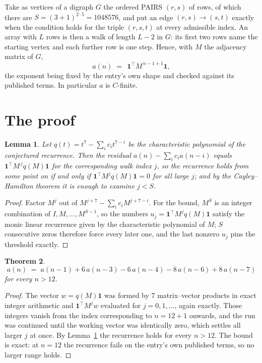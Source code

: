 \documentclass[11pt,a4paper]{article}
\theoremstyle{plain}
\newtheorem{theorem}{Theorem}
\newtheorem{lemma}[theorem]{Lemma}
\theoremstyle{definition}
\begin{document}
Take as vertices of a digraph $G$ the ordered PAIRS $(r,s)$ of rows, of which there are
$S=(3+1)^{2\cdot5}=1048576$, and put an edge $(r,s)\to(s,t)$ exactly when the condition
holds for the triple $(r,s,t)$ at every admissible index. An array with $L$ rows is then a
walk of length $L-2$ in $G$: its first two rows name the starting vertex and each further
row is one step. Hence, with $M$ the adjacency matrix of $G$,
\[
a(n)\;=\;\,\mathbf{1}^{\!\top}M^{\,n-1+1}\mathbf{1},
\]
the exponent being fixed by the entry's own shape and checked against its published terms.
In particular $a$ is $C$-finite.

\section{The proof}

\begin{lemma}\label{lem:crit}
Let $q(t)=t^{7}-\sum_i c_it^{7-i}$ be the characteristic polynomial of the
conjectured recurrence. Then the residual $a(n)-\sum_ic_ia(n-i)$ equals
$\mathbf{1}^{\!\top}M^{\,j}q(M)\mathbf{1}$ for the corresponding walk index
$j$, so the recurrence holds from some point on if and only if
$\mathbf{1}^{\!\top}M^{j}q(M)\mathbf{1}=0$ for all large $j$; and by the
Cayley--Hamilton theorem it is enough to examine $j<S$.
\end{lemma}

\begin{proof}
Factor $M^{j}$ out of $M^{j+7}-\sum_ic_iM^{j+7-i}$. For the bound, $M^{S}$
is an integer combination of $I,M,\dots,M^{S-1}$, so the numbers
$u_j=\mathbf{1}^{\!\top}M^{j}q(M)\mathbf{1}$ satisfy the monic linear recurrence given by
the characteristic polynomial of $M$; $S$ consecutive zeros therefore force every later one,
and the last nonzero $u_j$ pins the threshold exactly.
\end{proof}

\begin{theorem}
\[
a(n)\;=\;a(n-1) + 6\,a(n-3) - 6\,a(n-4) - 8\,a(n-6) + 8\,a(n-7)
\]
for every $n>12$.
\end{theorem}

\begin{proof}
The vector $w=q(M)\mathbf{1}$ was formed by $7$ matrix--vector products in exact
integer arithmetic and $\mathbf{1}^{\!\top}M^{j}w$ evaluated for $j=0,1,\dots$, again
exactly. Those integers vanish from the index corresponding to $n=12+1$ onwards, and the
run was continued until the working vector was identically zero, which settles all larger $j$
at once. By Lemma~\ref{lem:crit} the recurrence holds for every $n>12$. The bound is exact: at $n=12$ the recurrence fails on the entry's own published terms, so no larger range holds.
\end{proof}
\end{document}
